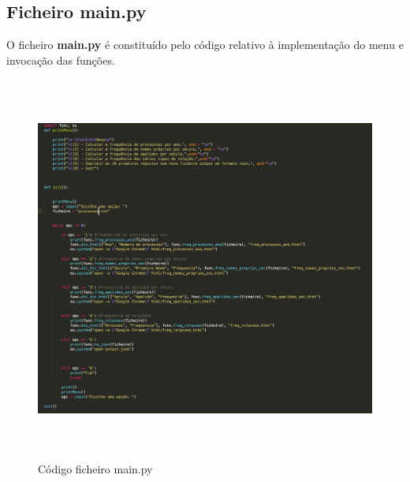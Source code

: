 \documentclass[a4paper, 12pt]{article}
\begin{document}
\subsection{Ficheiro main.py}
O ficheiro \textbf{main.py} é constituído pelo código relativo à implementação do menu e invocação das funções.
\begin{figure}[H]
    \centering
    \includegraphics[height=5in]{mennu.png}
    \caption{Código ficheiro main.py}
    \label{fig:my_label}
\end{figure}
\end{document}
